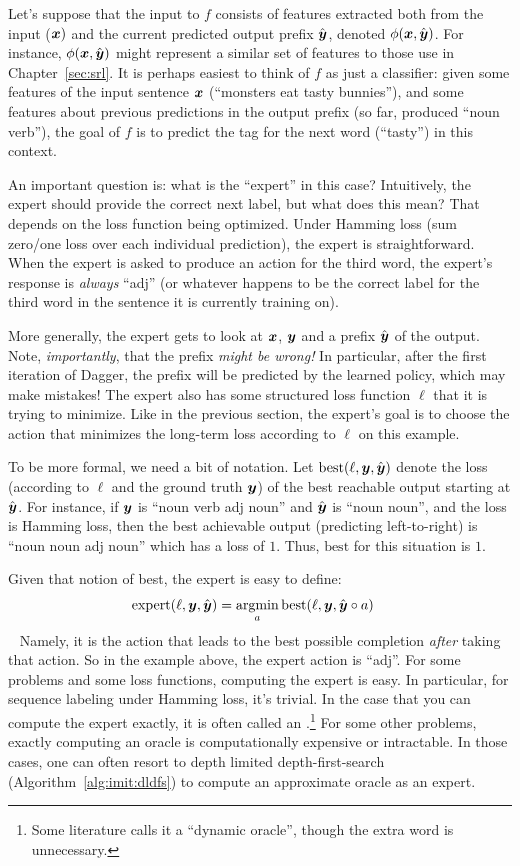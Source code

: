 Let's suppose that the input to $f$ consists of features extracted both from the input (${\boldsymbol{x}})$ and the current predicted output prefix $\hat{{\boldsymbol{y}}}$, denoted $\phi({\boldsymbol{x}}, \hat{{\boldsymbol{y}}})$.
For instance, $\phi({\boldsymbol{x}},\hat{{\boldsymbol{y}}})$ might represent a similar set of features to those use in Chapter~\ref{sec:srl}.
It is perhaps easiest to think of $f$ as just a classifier:
given some features of the input sentence ${\boldsymbol{x}}$ (``monsters eat tasty bunnies''),
and some features about previous predictions in the output prefix (so far, produced ``noun verb''),
the goal of $f$ is to predict the tag for the next word (``tasty'') in this context.

An important question is: what is the ``expert'' in this case?
Intuitively, the expert should provide the correct next label, but what does this mean?
That depends on the loss function being optimized.
Under Hamming loss (sum zero/one loss over each individual prediction), the expert is straightforward.
When the expert is asked to produce an action for the third word, the expert's response is \emph{always} ``adj'' (or whatever happens to be the correct label for the third word in the sentence it is currently training on).

More generally, the expert gets to look at ${\boldsymbol{x}}$, ${\boldsymbol{y}}$ and a prefix $\hat{{\boldsymbol{y}}}$ of the output.
Note, \emph{importantly}, that the prefix \emph{might be wrong!}
In particular, after the first iteration of Dagger, the prefix will be predicted by the learned policy, which may make mistakes!
The expert also has some structured loss function $\ell$ that it is trying to minimize.
Like in the previous section, the expert's goal is to choose the action that minimizes the long-term loss according to $\ell$ on this example.

To be more formal, we need a bit of notation.
Let $\text{best}(\ell, {\boldsymbol{y}}, \hat{{\boldsymbol{y}}})$ denote the loss (according to $\ell$ and the ground truth ${\boldsymbol{y}}$) of the best reachable output starting at $\hat{{\boldsymbol{y}}}$.
For instance, if ${\boldsymbol{y}}$ is ``noun verb adj noun'' and $\hat{{\boldsymbol{y}}}$ is ``noun noun'', and the loss is Hamming loss, then the best achievable output (predicting left-to-right) is ``noun noun adj noun'' which has a loss of $1$.
Thus, $\text{best}$ for this situation is $1$.

Given that notion of best, the expert is easy to define:
~
\begin{align}
  \text{expert}(\ell, \vy, \hat\vy)
  &= \argmin_a \text{best}(\ell, \vy, \hat\vy \circ a)
\end{align}
~
Namely, it is the action that leads to the best possible completion \emph{after} taking that action. 
So in the example above, the expert action is ``adj''.
For some problems and some loss functions, computing the expert is easy.
In particular, for sequence labeling under Hamming loss, it's trivial.
In the case that you can compute the expert exactly, it is often called an .\footnote{Some literature calls it a ``dynamic oracle'', though the extra word is unnecessary.}
For some other problems, exactly computing an oracle is computationally expensive or intractable.
In those cases, one can often resort to depth limited depth-first-search (Algorithm~\ref{alg:imit:dldfs}) to compute an approximate oracle as an expert.


